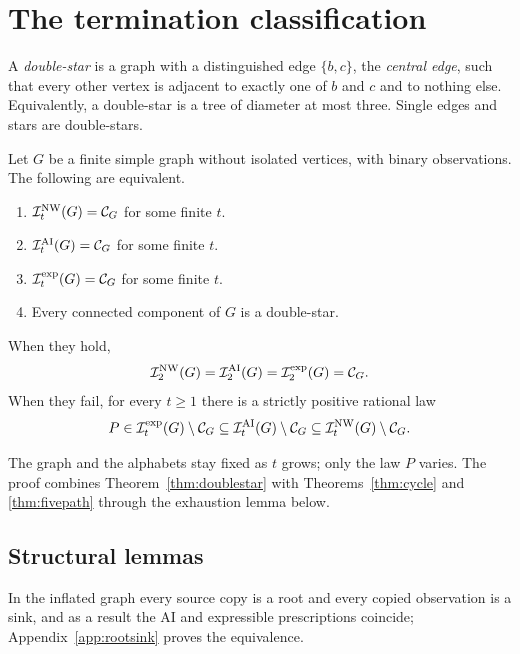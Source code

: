 \section{The termination classification}\label{sec:classification}

\providecommand{\Cscen}[1]{\mathcal C_{#1}}


\begin{definition}\label{def:doublestar}
A \emph{double-star} is a graph with a distinguished edge $\{b,c\}$, the \emph{central edge}, such that every other vertex is adjacent to exactly one of $b$ and $c$ and to nothing else. Equivalently, a double-star is a tree of diameter at most three. Single edges and stars are double-stars.
\end{definition}

\begin{theorem}\label{thm:classification}\label{thm:classification-intro}
Let $G$ be a finite simple graph without isolated vertices, with binary observations. The following are equivalent.
\begin{enumerate}[label=(\alph*),nosep]
\item $\INW_t(G)=\Cscen{G}$ for some finite $t$.
\item $\IAI_t(G)=\Cscen{G}$ for some finite $t$.
\item $\Iexp_t(G)=\Cscen{G}$ for some finite $t$.
\item Every connected component of $G$ is a double-star.
\end{enumerate}
When they hold,
\[
\INW_2(G)=\IAI_2(G)=\Iexp_2(G)=\Cscen{G}.
\]
When they fail, for every $t\ge1$ there is a strictly positive rational law
\[
P\in\Iexp_t(G)\setminus\Cscen{G}\subseteq\IAI_t(G)\setminus\Cscen{G}\subseteq\INW_t(G)\setminus\Cscen{G}.
\]
\end{theorem}

The graph and the alphabets stay fixed as $t$ grows; only the law $P$ varies. The proof combines Theorem~\ref{thm:doublestar} with Theorems~\ref{thm:cycle} and \ref{thm:fivepath} through the exhaustion lemma below.

\subsection{Structural lemmas}

In the inflated graph every source copy is a root and every copied observation is a sink, and as a result the AI and expressible prescriptions coincide; Appendix~\ref{app:rootsink} proves the equivalence.

